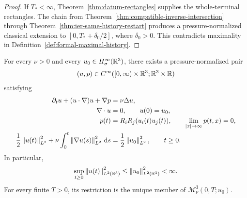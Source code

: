 \begin{proof}
If \(T_*<\infty\), Theorem~\ref{thm:datum-rectangles} supplies the
whole-terminal rectangles.  The chain from
Theorem~\ref{thm:compatible-inverse-intersection} through
Theorem~\ref{thm:ier-same-history-restart} produces a pressure-normalized classical
extension to \([0,T_*+\delta_0/2]\), where \(\delta_0>0\).  This contradicts
maximality in Definition~\ref{def:formal-maximal-history}.
\end{proof}

\begin{samepage}
\begin{theorem}
\label{thm:ier-global-smoothness}
For every \(\nu>0\) and every \(u_0\in H^\infty_\sigma(\mathbb R^3)\), there exists a
pressure-normalized pair
\begin{equation}
 (u,p)\in C^\infty([0,\infty)\times\mathbb R^3;\mathbb R^3\times\mathbb R)
 \label{eq:ier-global-class}
\end{equation}
satisfying
\begin{align}
 \partial_tu+(u\cdot\nabla)u+\nabla p&=\nu\Delta u,
 \label{eq:ier-global-momentum}\\
 \nabla\cdot u&=0,
 \qquad u(0)=u_0,
 \label{eq:ier-global-divergence-datum}\\
 p(t)&=R_iR_j(u_i(t)u_j(t)),
 \qquad \lim_{|x|\to\infty}p(t,x)=0,
 \label{eq:ier-global-pressure}\\
 \frac12\left\lVert u(t)\right\rVert_{L^2}^2
 +\nu\int_0^t\left\lVert \nabla u(s)\right\rVert_{L^2}^2\,\mathrm d s
 &=\frac12\left\lVert u_0\right\rVert_{L^2}^2,
 \qquad t\ge0.
 \label{eq:ier-global-energy}
\end{align}
In particular,
\begin{equation}
 \sup_{t\ge0}\left\lVert u(t)\right\rVert_{L^2(\mathbb R^3)}^2
 \le\left\lVert u_0\right\rVert_{L^2(\mathbb R^3)}^2<\infty.
 \label{eq:ier-global-energy-bound}
\end{equation}
For every finite \(T>0\), its restriction is the unique member of
\(\mathscr M_\nu^3(0,T;u_0)\).
\end{theorem}
\end{samepage}

